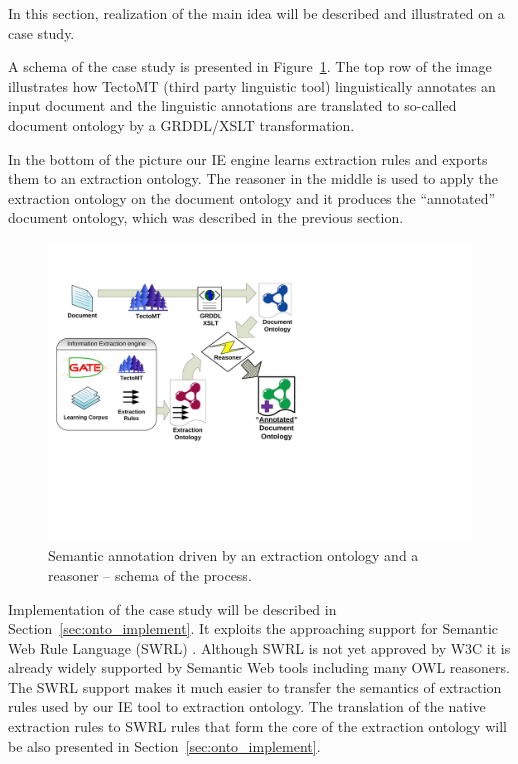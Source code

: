 In this section, realization of the main idea will be described and illustrated on a case study.

A schema of the case study is presented in Figure~\ref{fig:rules_app_schema}.  
The top row of the image illustrates how TectoMT (third party linguistic tool) linguistically annotates an input document and the linguistic annotations are translated to so-called document ontology by a GRDDL/XSLT transformation.

In the bottom of the picture our IE engine learns extraction rules and exports them to an extraction ontology. The reasoner in the middle is used to apply the extraction ontology on the document ontology and it produces the ``annotated'' document ontology, which was described in the previous section.


\begin{figure}
\centerline{\includegraphics[angle=-90, width=0.8\hsize]{semantic_rules_app_schema}}
\caption{Semantic annotation driven by an extraction ontology and a reasoner -- schema of the process.}
\label{fig:rules_app_schema}
\end{figure}

Implementation of the case study will be described in Section~\ref{sec:onto_implement}. It exploits the approaching support for Semantic Web Rule Language (SWRL) \citep{SWRL}. Although SWRL is not yet approved by W3C it is already widely supported by Semantic Web tools including many OWL reasoners. The SWRL support makes it much easier to transfer the semantics of extraction rules used by our IE tool to extraction ontology. The translation of the native extraction rules to SWRL rules that form the core of the extraction ontology will be also presented in Section~\ref{sec:onto_implement}.








